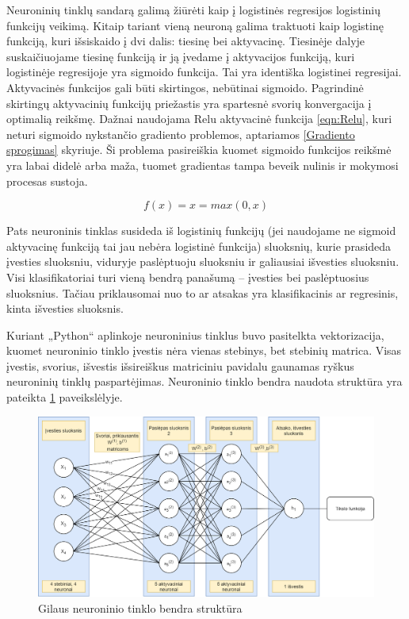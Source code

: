 \documentclass[a4paper, 12pt]{article}
\begin{document}
Neuroninių tinklų sandarą galimą žiūrėti kaip į logistinės regresijos logistinių funkcijų veikimą. Kitaip tariant vieną neuroną galima traktuoti kaip logistinę funkciją, kuri išsiskaido į dvi dalis: tiesinę bei aktyvacinę. Tiesinėje dalyje suskaičiuojame tiesinę funkciją ir ją įvedame į aktyvacijos funkciją, kuri logistinėje regresijoje yra sigmoido funkcija. Tai yra identiška logistinei regresijai. Aktyvacinės funkcijos gali būti skirtingos, nebūtinai sigmoido. Pagrindinė skirtingų aktyvacinių funkcijų priežastis yra spartesnė svorių konvergacija į optimalią reikšmę. Dažnai naudojama Relu aktyvacinė funkcija \ref{eqn:Relu}, kuri neturi sigmoido nykstančio gradiento problemos, aptariamos \ref{Gradiento sprogimas} skyriuje. Ši problema pasireiškia kuomet sigmoido funkcijos reikšmė yra labai didelė arba maža, tuomet gradientas tampa beveik nulinis ir mokymosi procesas sustoja. 

\begin{equation}
\label{eqn:Relu}
f(x) = x = max(0,x)
\end{equation}

Pats neuroninis tinklas susideda iš logistinių funkcijų (jei naudojame ne sigmoid aktyvacinę funkciją tai jau nebėra logistinė funkcija) sluoksnių, kurie prasideda įvesties sluoksniu, viduryje paslėptuoju sluoksniu ir galiausiai išvesties sluoksniu. Visi klasifikatoriai turi vieną bendrą panašumą – įvesties bei paslėptuosius sluoksnius. Tačiau priklausomai nuo to ar atsakas yra klasifikacinis ar regresinis, kinta išvesties sluoksnis. 

Kuriant „Python“ aplinkoje neuroninius tinklus buvo pasitelkta vektorizacija, kuomet neuroninio tinklo įvestis nėra vienas stebinys, bet stebinių matrica. Visas įvestis, svorius, išvestis išsireiškus matriciniu pavidalu gaunamas ryškus neuroninių tinklų paspartėjimas. Neuroninio tinklo bendra naudota struktūra yra pateikta \ref{neuronu diagrama} paveikslėlyje.

\begin{figure}[h]
\centering
\includegraphics[width=1\textwidth]{neuronu diagrama}
\caption{Gilaus neuroninio tinklo bendra struktūra}
\label{neuronu diagrama}
\end{figure}
\end{document}
